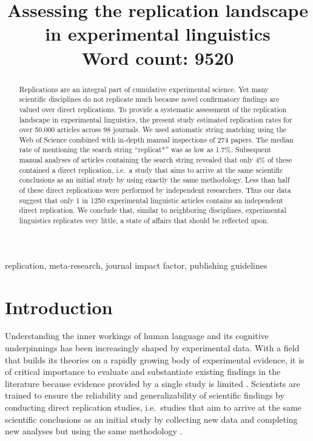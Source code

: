 \documentclass[cm,linguex]{glossa}
\title[Replication landscape in experimental linguistics]{Assessing the replication landscape in experimental linguistics\\ \bigskip \large Word count: 9520}
\author[Kobrock \& Roettger]{
    \spauthor{Kristina Kobrock\\
  \institute{University of Osnabrück}\\
  \small{\href{mailto:kristina.kobrock@uos.de}{\nolinkurl{kristina.kobrock@uos.de}}}
  }%
  \AND  \spauthor{Timo B. Roettger\\
  \institute{Universitetet i Oslo}\\
  \small{\href{mailto:timo.b.roettger@gmail.com}{\nolinkurl{timo.b.roettger@gmail.com}}}
  }%
  }
\begin{document}
\sffamily
\maketitle

\begin{abstract}
Replications are an integral part of cumulative experimental science. Yet many scientific disciplines do not replicate much because novel confirmatory findings are valued over direct replications. To provide a systematic assessment of the replication landscape in experimental linguistics, the present study estimated replication rates for over 50.000 articles across 98 journals. We used automatic string matching using the Web of Science combined with in-depth manual inspections of 274 papers. The median rate of mentioning the search string ``replicat*'' was as low as 1.7\%. Subsequent manual analyses of articles containing the search string revealed that only 4\% of these contained a direct replication, i.e.~a study that aims to arrive at the same scientific conclusions as an initial study by using exactly the same methodology. Less than half of these direct replications were performed by independent researchers. Thus our data suggest that only 1 in 1250 experimental linguistic articles contains an independent direct replication. We conclude that, similar to neighboring disciplines, experimental linguistics replicates very little, a state of affairs that should be reflected upon.
\end{abstract}

\begin{keywords}
  replication, meta-research, journal impact factor, publishing guidelines
\end{keywords}

\rmfamily

\hypertarget{introduction}{%
\section{Introduction}\label{introduction}}

Understanding the inner workings of human language and its cognitive underpinnings has been increasingly shaped by experimental data. With a field that builds its theories on a rapidly growing body of experimental evidence, it is of critical importance to evaluate and substantiate existing findings in the literature because evidence provided by a single study is limited \citep[e.g.,][]{amrhein2019inferential}. Scientists are trained to ensure the reliability and generalizability of scientific findings by conducting direct replication studies, i.e.~studies that aim to arrive at the same scientific conclusions as an initial study by collecting new data and completing new analyses but using the same methodology \citep[see][ for a comprehensive overview of different terminological uses]{barba_terminologies_2018}.
\end{document}
